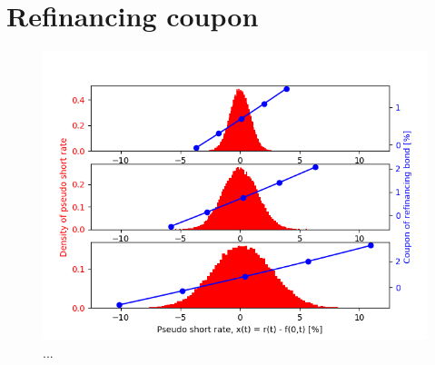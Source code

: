 \chapter{Refinancing coupon}

\begin{figure}
\centering
\includegraphics[scale=0.7]{figures/refi_coupon_interpolation.png}
\caption{...}
\end{figure}
